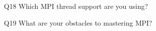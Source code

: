\begin{description}%
\item{Q18} Which MPI thread support are you using?%
\item{Q19} What are your obstacles to mastering MPI?%
\end{description}%
